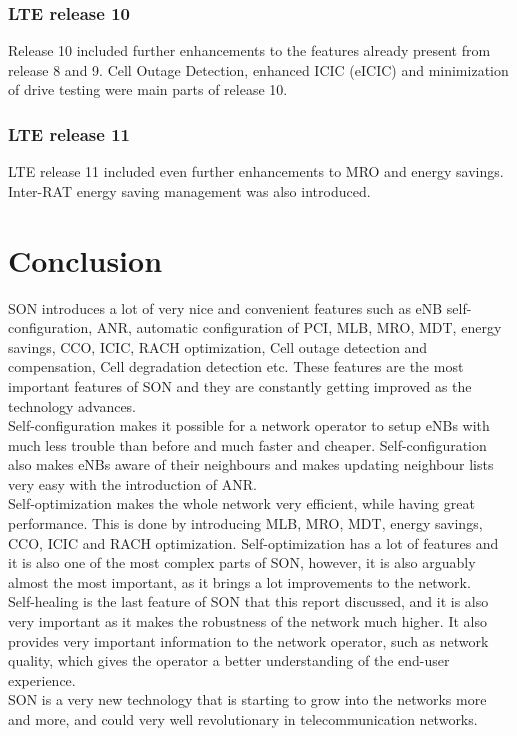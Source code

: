 \documentclass{report}
\begin{document}
\subsection{LTE release 10}
Release 10 included further enhancements to the features already present from release 8 and 9. Cell Outage Detection, enhanced ICIC (eICIC) and minimization of drive testing were main parts of release 10. 
\subsection{LTE release 11}
LTE release 11 included even further enhancements to MRO and energy savings. Inter-RAT energy saving management was also introduced.\cite{Atayero2014} \cite{3gpp}

\chapter{Conclusion}
SON introduces a lot of very nice and convenient features such as eNB self-configuration, ANR, automatic configuration of PCI, MLB, MRO, MDT, energy savings, CCO, ICIC, RACH optimization, Cell outage detection and compensation, Cell degradation detection etc. These features are the most important features of SON and they are constantly getting improved as the technology advances. \\ Self-configuration makes it possible for a network operator to setup eNBs with much less trouble than before and much faster and cheaper. Self-configuration also makes eNBs aware of their neighbours and makes updating neighbour lists very easy with the introduction of ANR. \\ Self-optimization makes the whole network very efficient, while having great performance. This is done by introducing MLB, MRO, MDT, energy savings, CCO, ICIC and RACH optimization. Self-optimization has a lot of features and it is also one of the most complex parts of SON, however, it is also arguably almost the most important, as it brings a lot improvements to the network.  \\ Self-healing is the last feature of SON that this report discussed, and it is also very important as it makes the robustness of the network much higher. It also provides very important information to the network operator, such as network quality, which gives the operator a better understanding of the end-user experience. \\ SON is a very new technology that is starting to grow into the networks more and more, and could very well revolutionary in telecommunication networks. 

\clearpage
{}


\end{document}
